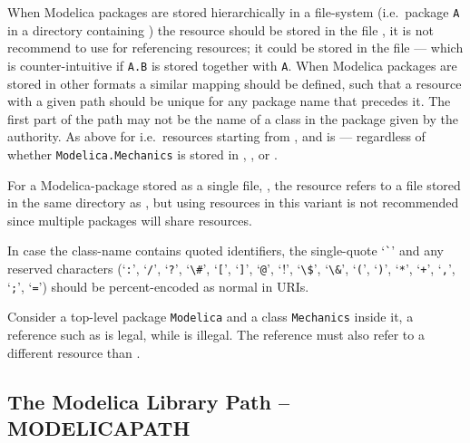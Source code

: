 When Modelica packages are stored hierarchically in a file-system (i.e.\ package \lstinline!A! in a directory  containing ) the resource
 should be stored in the file , it is not recommend to use  for referencing
resources; it could be stored in the file  --- which is counter-intuitive if \lstinline!A.B! is stored together with \lstinline!A!.  When Modelica packages
are stored in other formats a similar mapping should be defined, such that a resource with a given path should be unique for any package name that precedes it.  The first
part of the path may not be the name of a class in the package given by the authority.  As above for  i.e.\ resources starting from
, and  is  --- regardless of whether \lstinline!Modelica.Mechanics!
is stored in , , or .

For a Modelica-package stored as a single file, , the resource
 refers to a file  stored in the same
directory as , but using resources in this variant is not
recommended since multiple packages will share resources.

In case the class-name contains quoted identifiers, the single-quote `\lstinline!`!'
and any reserved characters (`\lstinline!:!', `\lstinline!/!', `\lstinline!?!', `\lstinline!\#!', `\lstinline![!',
`\lstinline!]!', `\lstinline!@!', `\lstinline!!!', `\lstinline!\$!', `\lstinline!\&!', `\lstinline!(!', `\lstinline!)!', `\lstinline!*!', `\lstinline!+!',
`\lstinline!,!', `\lstinline!;!', `\lstinline!=!') should be percent-encoded as normal in URIs.

\begin{example}
Consider a top-level package \lstinline!Modelica! and a class
\lstinline!Mechanics! inside it, a reference such as
 is legal, while
 is illegal. The reference
 must also refer to a different
resource than .
\end{example}

\subsection{The Modelica Library Path -- MODELICAPATH}

